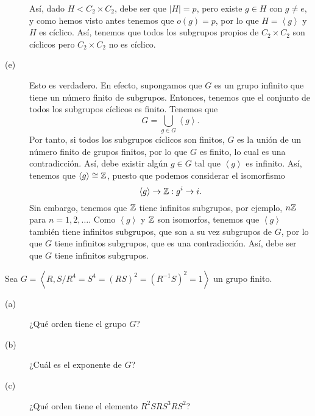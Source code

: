 \documentclass{article}
\begin{document}
\begin{sol}
\begin{description}
Así, dado $\displaystyle H < C_{2} \times C_{2} $, debe ser que $\displaystyle \left|H\right| = p $, pero existe $\displaystyle g \in H $ con $\displaystyle g \neq e $, y como hemos visto antes tenemos que $\displaystyle o\left(g\right) = p $, por lo que $\displaystyle H = \left\langle g \right\rangle  $ y $\displaystyle H $ es cíclico. Así, tenemos que todos los subgrupos propios de $\displaystyle C_{2} \times C_{2} $ son cíclicos pero $\displaystyle C_{2} \times C_{2} $ no es cíclico.
\item[(e)] Esto es verdadero. En efecto, supongamos que $\displaystyle G $ es un grupo infinito que tiene un número finito de subgrupos. Entonces, tenemos que el conjunto de todos los subgrupos cíclicos es finito. Tenemos que 
	\[G = \bigcup_{g \in G}\left\langle g \right\rangle  .\]
	Por tanto, si todos los subgrupos cíclicos son finitos, $\displaystyle G $ es la unión de un número finito de grupos finitos, por lo que $\displaystyle G $ es finito, lo cual es una contradicción. Así, debe existir algún $\displaystyle g \in G $ tal que $\displaystyle \left\langle g \right\rangle  $ es infinito. Así, tenemos que $\displaystyle \left\langle g \right\rangle \cong \mathbb{Z} $, puesto que podemos considerar el isomorfismo
	\[\left\langle g \right\rangle \to \mathbb{Z} : g^{i} \to i .\]
Sin embargo, tenemos que $\displaystyle \mathbb{Z} $ tiene infinitos subgrupos, por ejemplo, $\displaystyle n \mathbb{Z} $ para $\displaystyle n = 1, 2, \ldots $. Como $\displaystyle \left\langle g \right\rangle  $ y $\displaystyle \mathbb{Z} $ son isomorfos, tenemos que $\displaystyle \left\langle g \right\rangle  $ también tiene infinitos subgrupos, que son a su vez subgrupos de $\displaystyle G $, por lo que $\displaystyle G $ tiene infinitos subgrupos, que es una contradicción. Así, debe ser que $\displaystyle G $ tiene infinitos subgrupos.	
\end{description}
\end{sol}

\begin{ej}
Sea $\displaystyle G = \left\langle R, S/R^{4}=S^{4}=\left(RS\right)^{2} = \left(R^{-1}S\right)^{2} = 1 \right\rangle  $ un grupo finito.
\begin{description}
\item[(a)] ¿Qué orden tiene el grupo $\displaystyle G $?
\item[(b)] ¿Cuál es el exponente de $\displaystyle G $?
\item[(c)] ¿Qué orden tiene el elemento $\displaystyle R^{2}SRS^{3}RS^{2} $?
\end{description}
\end{ej}
\end{document}
